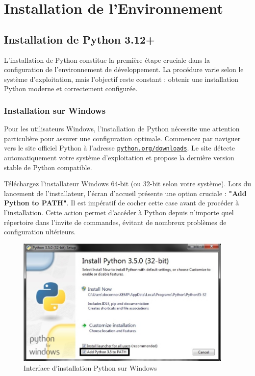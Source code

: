 \section{Installation de l'Environnement}

\subsection{Installation de Python 3.12+}

L'installation de Python constitue la première étape cruciale dans la configuration de l'environnement de développement. La procédure varie selon le système d'exploitation, mais l'objectif reste constant : obtenir une installation Python moderne et correctement configurée.
\subsubsection{Installation sur Windows}

Pour les utilisateurs Windows, l'installation de Python nécessite une attention particulière pour assurer une configuration optimale. Commencez par naviguer vers le site officiel Python à l'adresse \texttt{\href{https://www.python.org/downloads/}{python.org/downloads}}. Le site détecte automatiquement votre système d'exploitation et propose la dernière version stable de Python compatible.

Téléchargez l'installateur Windows 64-bit (ou 32-bit selon votre système). Lors du lancement de l'installateur, l'écran d'accueil présente une option cruciale : \textbf{"Add Python to PATH"}. Il est impératif de cocher cette case avant de procéder à l'installation. Cette action permet d'accéder à Python depuis n'importe quel répertoire dans l'invite de commandes, évitant de nombreux problèmes de configuration ultérieurs.

\begin{figure}[H]
\centering
\includegraphics[width=0.95\textwidth]{images/python_installation.png}
\caption{Interface d'installation Python sur Windows}
\end{figure}

